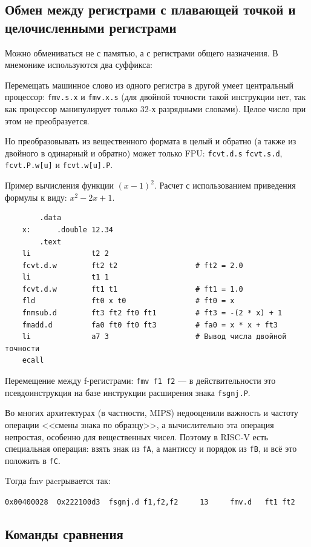 \subsection{Обмен между регистрами с плавающей точкой и целочисленными регистрами}

Можно обмениваться не с памятью, а с регистрами общего назначения. В мнемонике используются два суффикса:

Перемещать машинное слово из одного регистра в другой умеет центральный процессор: \verb|fmv.s.x| и \verb|fmv.x.s| (для двойной точности такой инструкции нет, так как процессор манипулирует только 32-х разрядными словами). Целое число при этом не преобразуется.

Но преобразовывать из вещественного формата в целый и обратно (а также из двойного в одинарный и обратно) может только FPU: \verb|fcvt.d.s| \verb|fcvt.s.d|, \verb|fcvt.P.w[u]| и \verb|fcvt.w[u].P|.

Пример вычисления функции $(x-1)^2$. Расчет с использованием приведения формулы к виду: $x^2-2x+1$.
\begin{verbatim}
        .data
    x:      .double 12.34
        .text
    li              t2 2
    fcvt.d.w        ft2 t2                  # ft2 = 2.0
    li              t1 1
    fcvt.d.w        ft1 t1                  # ft1 = 1.0
    fld             ft0 x t0                # ft0 = x
    fnmsub.d        ft3 ft2 ft0 ft1         # ft3 = -(2 * x) + 1
    fmadd.d         fa0 ft0 ft0 ft3         # fa0 = x * x + ft3
    li              a7 3                    # Вывод числа двойной точности
    ecall
\end{verbatim}

Перемещение между f-регистрами: \verb|fmv f1 f2| --- в действительности это псевдоинструкция на базе инструкции расширения знака \verb|fsgnj.P|.

Во многих архитектурах (в частности, MIPS) недооценили важность и частоту операции <<смены знака по образцу>>, а вычислительно эта операция непростая, особенно для вещественных чисел. Поэтому в RISC-V есть специальная операция: взять знак из \verb|fA|, а мантиссу и порядок из \verb|fB|, и всё это положить в \verb|fC|.

Tогда fmv раcrрывается так:

\verb|0x00400028  0x222100d3  fsgnj.d f1,f2,f2     13     fmv.d   ft1 ft2|

\subsection{Команды сравнения}

